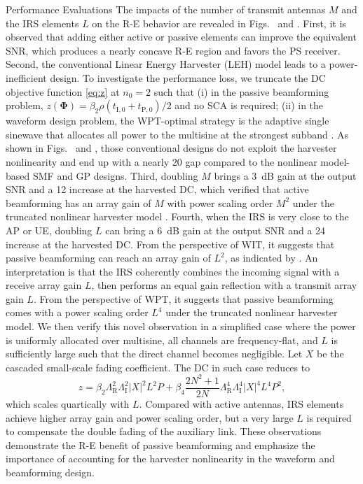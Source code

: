 \documentclass[journal]{IEEEtran}
\begin{document}
\begin{section}{Performance Evaluations}
		The impacts of the number of transmit antennas $M$ and the IRS elements $L$ on the R-E behavior are revealed in Figs.~ and . First, it is observed that adding either active or passive elements can improve the equivalent SNR, which produces a nearly concave R-E region and favors the PS receiver. Second, the conventional Linear Energy Harvester (LEH) model leads to a power-inefficient design. To investigate the performance loss, we truncate the DC objective function \eqref{eq:z} at $n_0=2$ such that (i) in the passive beamforming problem, $z(\boldsymbol{\Phi}) = {\beta_2}{\rho}(t_{\mathrm{I},0}+t_{\mathrm{P},0})/2$ and no SCA is required; (ii) in the waveform design problem, the WPT-optimal strategy is the adaptive single sinewave that allocates all power to the multisine at the strongest subband \cite{Clerckx2016a}. As shown in Figs.~ and , those conventional designs do not exploit the harvester nonlinearity and end up with a nearly \SI{20}{\dBA} gap compared to the nonlinear model-based SMF and GP designs. Third, doubling $M$ brings a \SI{3}{\dB} gain at the output SNR and a \SI{12}{\dBA} increase at the harvested DC, which verified that active beamforming has an array gain of $M$ \cite{Tse2005} with power scaling order $M^2$ under the truncated nonlinear harvester model \cite{Clerckx2016a,Clerckx2018b}. Fourth, when the IRS is very close to the AP or UE, doubling $L$ can bring a \SI{6}{\dB} gain at the output SNR and a \SI{24}{\dBA} increase at the harvested DC. From the perspective of WIT, it suggests that passive beamforming can reach an array gain of $L^2$, as indicated by \cite{Wu2019}. An interpretation is that the IRS coherently combines the incoming signal with a receive array gain $L$, then performs an equal gain reflection with a transmit array gain $L$. From the perspective of WPT, it suggests that passive beamforming comes with a power scaling order $L^4$ under the truncated nonlinear harvester model. We then verify this novel observation in a simplified case where the power is uniformly allocated over multisine, all channels are frequency-flat, and $L$ is sufficiently large such that the direct channel becomes negligible. Let $X$ be the cascaded small-scale fading coefficient. The DC in such case reduces to
		\begin{equation}
			z = \beta_2 \Lambda_{\mathrm{R}}^2 \Lambda_{\mathrm{I}}^2 \lvert X \rvert^2 L^2 P + \beta_4 \frac{2N^2 + 1}{2N} \Lambda_{\mathrm{R}}^4 \Lambda_{\mathrm{I}}^4 \lvert X \rvert^4 L^4 P^2,
		\end{equation}
		which scales quartically with $L$. Compared with active antennas, IRS elements achieve higher array gain and power scaling order, but a very large $L$ is required to compensate the double fading of the auxiliary link. These observations demonstrate the R-E benefit of passive beamforming and emphasize the importance of accounting for the harvester nonlinearity in the waveform and beamforming design.


\end{section}
\end{document}

